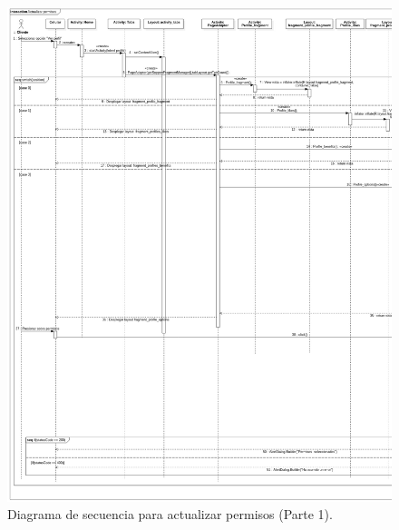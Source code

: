 \FloatBarrier
\begin{figure}[htbp!]
		\centering
			\includegraphics[width=1 \textwidth]{imagenes/Diagramas_UserApp/Nuevos_diagramas/permisos1}
		\caption{Diagrama de secuencia para actualizar permisos (Parte 1).}
		\label{image:permisos2}
\end{figure}
\FloatBarrier

